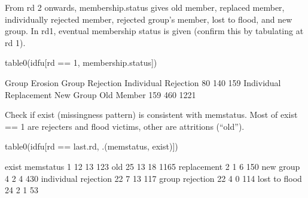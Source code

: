 From rd 2 onwards, \textsf{membership.status} gives old member, replaced member, individually rejected member, rejected group's member, lost to flood, and new group. In rd1, eventual membership status is given (confirm this by tabulating at rd 1). 
\begin{Schunk}
\begin{Sinput}
table0(idfu[rd == 1, membership.status])
\end{Sinput}
\begin{Soutput}

         Group Erosion        Group Rejection   Individual Rejection 
                    80                    140                    159 
Individual Replacement              New Group             Old Member 
                   159                    460                   1221 
\end{Soutput}
\end{Schunk}
Check if \textsf{exist} (missingness pattern) is consistent with \textsf{memstatus}. Most of \textsf{exist} == 1 are rejecters and flood victims, other are attritions (``old'').
\begin{Schunk}
\begin{Sinput}
table0(idfu[rd == last.rd, .(memstatus, exist)])
\end{Sinput}
\begin{Soutput}
                      exist
memstatus                 1   12   13  123
  old                    25   13   18 1165
  replacement             2    1    6  150
  new group               4    2    4  430
  individual rejection   22    7   13  117
  group rejection        22    4    0  114
  lost to flood          24    2    1   53
\end{Soutput}
\end{Schunk}

